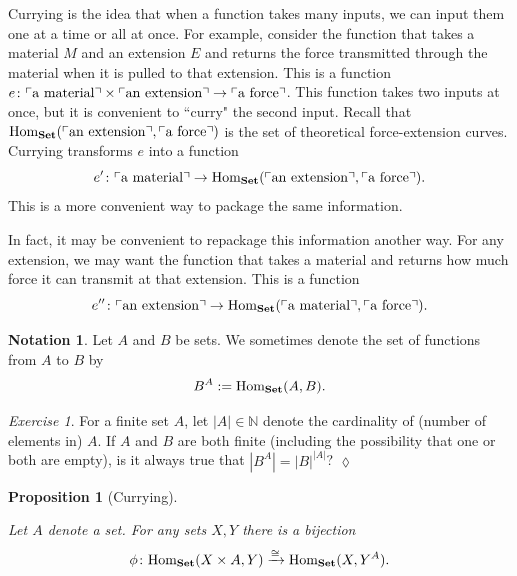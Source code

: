 \documentclass{book}
\def\tn{\textnormal}
\def\NN{{\mathbb N}}
\def\Hom{\tn{Hom}}
\def\to{\rightarrow}
\def\taking{\colon}
\def\iso{\cong}
\newcommand{\fakebox}[1]{\tn{$\ulcorner$#1$\urcorner$}}
\newcommand{\To}[1]{\xrightarrow{#1}}
\def\Set{{\bf Set}}
\newtheorem{proposition}[subsubsection]{Proposition}
\theoremstyle{remark}
\newtheorem{exc}[subsubsection]{Exercise}
\newenvironment{exercise}{\begin{exc}}{\hspace*{\fill}$\lozenge$\end{exc}}
\theoremstyle{definition}
\newtheorem{notation}[subsubsection]{Notation}
\begin{document}
Currying is the idea that when a function takes many inputs, we can input them one at a time or all at once. For example, consider the function that takes a material $M$ and an extension $E$ and returns the force transmitted through the material when it is pulled to that extension. This is a function $e\taking \fakebox{a material}\times\fakebox{an extension}\to\fakebox{a force}$. This function takes two inputs at once, but it is convenient to ``curry" the second input. Recall that $\Hom_\Set(\fakebox{an extension},\fakebox{a force})$ is the set of theoretical force-extension curves. Currying transforms $e$ into a function $$e'\taking\fakebox{a material}\to\Hom_\Set(\fakebox{an extension},\fakebox{a force}).$$ This is a more convenient way to package the same information. 

In fact, it may be convenient to repackage this information another way. For any extension, we may want the function that takes a material and returns how much force it can transmit at that extension. This is a function $$e''\taking\fakebox{an extension}\to\Hom_\Set(\fakebox{a material},\fakebox{a force}).$$ 

\begin{notation}\index{exponentials ! in $\Set$}
Let $A$ and $B$ be sets. We sometimes denote the set of functions from $A$ to $B$ by 
\begin{align}\label{dia:exponential sets}
B^A:=\Hom_\Set(A,B).
\end{align}
\end{notation}

\begin{exercise}
For a finite set $A$, let $|A|\in\NN$ denote the cardinality of (number of elements in) $A$. If $A$ and $B$ are both finite (including the possibility that one or both are empty), is it always true that $|B^A|=|B|^{|A|}$?
\end{exercise}

\begin{proposition}[Currying]\label{prop:curry}

Let $A$ denote a set. For any sets $X,Y$ there is a bijection 
\begin{align}\label{dia:curry bijection}
\phi\taking\Hom_\Set(X\times A,Y)\To{\iso}\Hom_\Set(X,Y^A).
\end{align}

\end{proposition}
\end{document}
